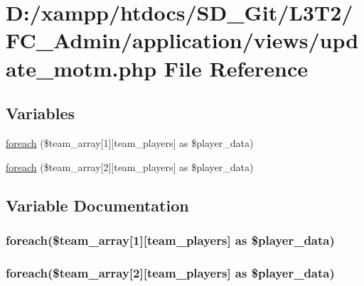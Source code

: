 \hypertarget{update__motm_8php}{}\section{D\+:/xampp/htdocs/\+S\+D\+\_\+\+Git/\+L3\+T2/\+F\+C\+\_\+\+Admin/application/views/update\+\_\+motm.php File Reference}
\label{update__motm_8php}
\subsection*{Variables}
\begin{DoxyCompactItemize}
\item 
\hyperlink{update__motm_8php_aaccf9252a4f875e70c0cfd1d52c9171f}{foreach} (\$team\+\_\+array\mbox{[}1\mbox{]}\mbox{[}\textquotesingle{}team\+\_\+players\textquotesingle{}\mbox{]} as \$player\+\_\+data)
\item 
\hyperlink{update__motm_8php_abeab6a26bd555493954237237fe07f02}{foreach} (\$team\+\_\+array\mbox{[}2\mbox{]}\mbox{[}\textquotesingle{}team\+\_\+players\textquotesingle{}\mbox{]} as \$player\+\_\+data)
\end{DoxyCompactItemize}


\subsection{Variable Documentation}
\hypertarget{update__motm_8php_aaccf9252a4f875e70c0cfd1d52c9171f}{}
\subsubsection[{foreach}]{\setlength{\rightskip}{0pt plus 5cm}foreach(\$team\+\_\+array\mbox{[}1\mbox{]}\mbox{[}\textquotesingle{}team\+\_\+players\textquotesingle{}\mbox{]} as \$player\+\_\+data)}\label{update__motm_8php_aaccf9252a4f875e70c0cfd1d52c9171f}
\hypertarget{update__motm_8php_abeab6a26bd555493954237237fe07f02}{}
\subsubsection[{foreach}]{\setlength{\rightskip}{0pt plus 5cm}foreach(\$team\+\_\+array\mbox{[}2\mbox{]}\mbox{[}\textquotesingle{}team\+\_\+players\textquotesingle{}\mbox{]} as \$player\+\_\+data)}\label{update__motm_8php_abeab6a26bd555493954237237fe07f02}
